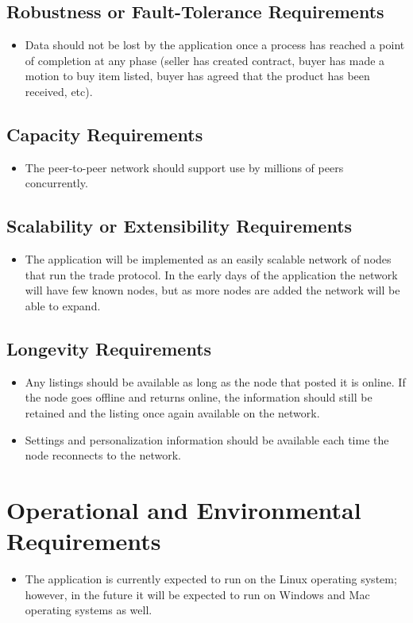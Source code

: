 \documentclass{article}
\begin{document}
\subsection{Robustness or Fault-Tolerance Requirements}
\begin{itemize}
\item
Data should not be lost by the application once a process has reached a point of completion at any phase (seller has created contract, buyer has made a motion to buy item listed, buyer has agreed that the product has been received, etc).  
\end{itemize}
\subsection{Capacity Requirements}
\begin{itemize}
\item 
The peer-to-peer network should support use by millions of peers concurrently. 
\end{itemize}
\subsection{Scalability or Extensibility Requirements}
\begin{itemize}
\item 
The application will be implemented as an easily scalable network of nodes that run the trade protocol. In the early days of the application the network will have few known nodes, but as more nodes are added the network will be able to expand. 
\end{itemize}
\subsection{Longevity Requirements}
\begin{itemize}
\item 
 Any listings should be available as long as the node that posted it is online. If the node goes offline and returns online, the information should still be retained and the listing once again available on the network.
 \item
Settings and personalization information should be available each time the node reconnects to the network.
\end{itemize}
\section{Operational and Environmental Requirements}
\begin{itemize}
 \item 
The application is currently expected to run on the Linux operating system; however, in the future it will be expected to run on Windows and Mac operating systems as well.
\end{itemize}
\end{document}
